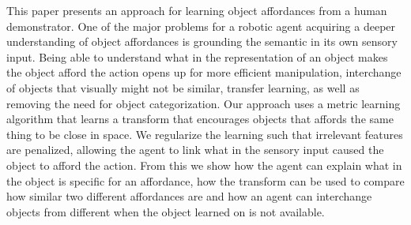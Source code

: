 This paper presents an approach for learning object affordances from a
human demonstrator. One of the major problems for a robotic agent
acquiring a deeper understanding of object affordances is grounding the
semantic in its own sensory input. Being able to understand what in the
representation of an object makes the object afford the action opens up
for more efficient manipulation, interchange of objects that visually
might not be similar, transfer learning, as well as removing the need
for object categorization. Our approach uses a metric learning algorithm
that learns a transform that encourages objects that affords the same
thing to be close in space. We regularize the learning such that
irrelevant features are penalized, allowing the agent to link what in
the sensory input caused the object to afford the action. From this we
show how the agent can explain what in the object is specific for an
affordance, how the transform can be used to compare how similar two
different affordances are and how an agent can interchange objects from
different when the object learned on is not available.

\begin{comment}
1. state the problem
2. say why it is interesting
3. say what your solution achieves
4. say what follows from your solution.
\end{comment}
